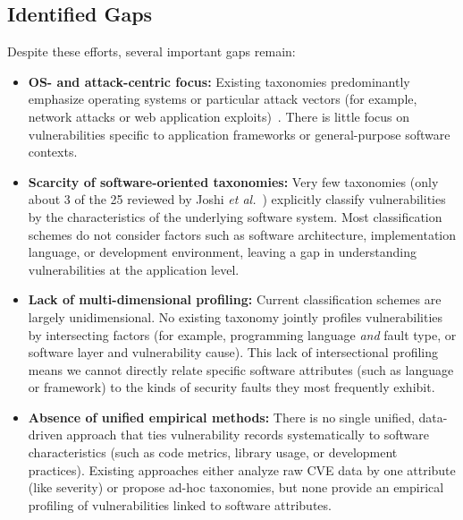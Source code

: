 \subsection{Identified Gaps}
Despite these efforts, several important gaps remain:
\begin{itemize}
  \item \textbf{OS- and attack-centric focus:} Existing taxonomies predominantly emphasize operating systems or particular attack vectors (for example, network attacks or web application exploits)~\cite{Joshi2015ARO}.  There is little focus on vulnerabilities specific to application frameworks or general-purpose software contexts.
  \item \textbf{Scarcity of software-oriented taxonomies:} Very few taxonomies (only about 3 of the 25 reviewed by Joshi \textit{et al.}~\cite{Joshi2015ARO}) explicitly classify vulnerabilities by the characteristics of the underlying software system. Most classification schemes do not consider factors such as software architecture, implementation language, or development environment, leaving a gap in understanding vulnerabilities at the application level.
  \item \textbf{Lack of multi-dimensional profiling:} Current classification schemes are largely unidimensional. No existing taxonomy jointly profiles vulnerabilities by intersecting factors (for example, programming language \emph{and} fault type, or software layer and vulnerability cause). This lack of intersectional profiling means we cannot directly relate specific software attributes (such as language or framework) to the kinds of security faults they most frequently exhibit.
  \item \textbf{Absence of unified empirical methods:} There is no single unified, data-driven approach that ties vulnerability records systematically to software characteristics (such as code metrics, library usage, or development practices). Existing approaches either analyze raw CVE data by one attribute (like severity) or propose ad-hoc taxonomies, but none provide an empirical profiling of vulnerabilities linked to software attributes.
\end{itemize}

